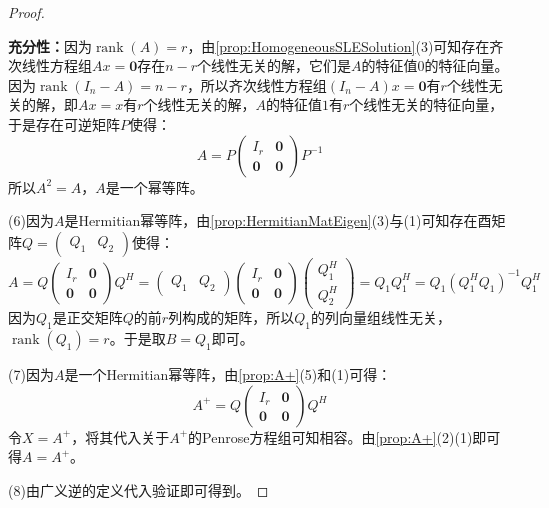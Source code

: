 \begin{proof}
\begin{equation*}
	\end{equation*}\par
	\textbf{充分性：}因为$\operatorname{rank}(A)=r$，由\cref{prop:HomogeneousSLESolution}(3)可知存在齐次线性方程组$Ax=\mathbf{0}$存在$n-r$个线性无关的解，它们是$A$的特征值$0$的特征向量。因为$\operatorname{rank}(I_n-A)=n-r$，所以齐次线性方程组$(I_n-A)x=\mathbf{0}$有$r$个线性无关的解，即$Ax=x$有$r$个线性无关的解，$A$的特征值$1$有$r$个线性无关的特征向量，于是存在可逆矩阵$P$使得：
	\begin{equation*}
		A=P
		\begin{pmatrix}
			I_r & \mathbf{0} \\
			\mathbf{0} & \mathbf{0}
		\end{pmatrix}P^{-1}
	\end{equation*}
	所以$A^2=A$，$A$是一个幂等阵。\par
	(6)因为$A$是Hermitian幂等阵，由\cref{prop:HermitianMatEigen}(3)与(1)可知存在酉矩阵$Q=\begin{pmatrix}
		Q_1 & Q_2
	\end{pmatrix}$使得：
	\begin{equation*}
		A=Q\begin{pmatrix}
			I_r & \mathbf{0} \\
			\mathbf{0} & \mathbf{0}
		\end{pmatrix}Q^H=
		\begin{pmatrix}
			Q_1 & Q_2
		\end{pmatrix}
		\begin{pmatrix}
			I_r & \mathbf{0} \\
			\mathbf{0} & \mathbf{0}
		\end{pmatrix}
		\begin{pmatrix}
			Q_1^H \\
			Q_2^H
		\end{pmatrix}
		=Q_1Q_1^H=Q_1(Q_1^HQ_1)^{-1}Q_1^H
	\end{equation*}
	因为$Q_1$是正交矩阵$Q$的前$r$列构成的矩阵，所以$Q_1$的列向量组线性无关，$\operatorname{rank}(Q_1)=r$。于是取$B=Q_1$即可。\par
	(7)因为$A$是一个Hermitian幂等阵，由\cref{prop:A+}(5)和(1)可得：
	\begin{equation*}
		A^+=Q
		\begin{pmatrix}
			I_r & \mathbf{0} \\
			\mathbf{0} & \mathbf{0}
		\end{pmatrix}Q^H
	\end{equation*}
	令$X=A^+$，将其代入关于$A^+$的Penrose方程组可知相容。由\cref{prop:A+}(2)(1)即可得$A=A^+$。\par
	(8)由广义逆的定义代入验证即可得到。
\end{proof}

